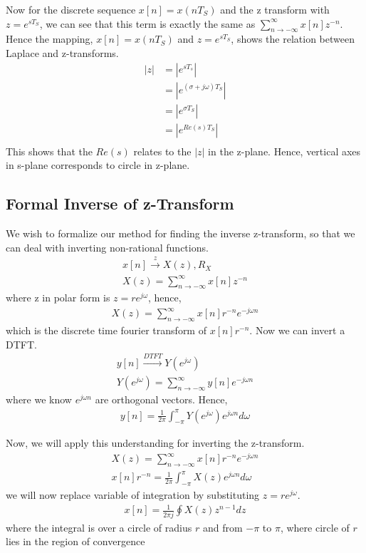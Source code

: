 Now for the discrete sequence $x[n] = x(nT_S)$ and the z transform with $z = e^{sT_S}$, we can see that this term is exactly the same as $\sum_{n \rightarrow -\infty}^{\infty}{x[n]z^{-n}}$.\\

Hence the mapping,  $x[n] = x(nT_S)$ and $z = e^{sT_S}$, shows the relation between Laplace and z-transforms.
\begin{align*}
|z| &= |e^{sT_s}| \\
&= |e^{(\sigma + j\omega)T_S}|\\
& = |e^{\sigma T_S}|\\
& = |e^{Re(s) T_S}|\\
\end{align*}
This shows that the $Re(s)$ relates to the $|z|$ in the z-plane. Hence, vertical axes in s-plane corresponds to circle in z-plane. 
\subsection{Formal Inverse of z-Transform}
We wish to formalize our method for finding the inverse z-transform, so that we can deal with inverting non-rational functions.
\begin{align*}
x[n] \xrightarrow{z} X(z), R_X\\
X(z) = \sum_{n \rightarrow -\infty}^{\infty}{x[n]z^{-n}}
\end{align*}
where z in polar form is $z = re^{j\omega}$, hence,
\begin{align*}
X(z) = \sum_{n \rightarrow -\infty}^{\infty}{x[n]r^{-n}e^{-j\omega n}}
\end{align*}
which is the discrete time fourier transform of $x[n]r^{-n}$. Now we can invert a DTFT. 
\begin{align*}
y[n] \xrightarrow{DTFT} Y(e^{j\omega})\\
Y(e^{j\omega}) = \sum_{n \rightarrow -\infty}^{\infty}{y[n]e^{-j\omega n}}
\end{align*}
where we know $e^{j\omega n}$ are orthogonal vectors. Hence,
\begin{align*}
y[n] =\frac{1}{2\pi} \int_{-\pi}^{\pi}{Y(e^{j\omega})e^{j\omega n}d\omega }
\end{align*}

Now, we will apply this understanding for inverting the z-transform.
\begin{align*}
X(z) = \sum_{n \rightarrow -\infty}^{\infty}{x[n]r^{-n}e^{-j\omega n}}\\
x[n]r^{-n} = \frac{1}{2\pi} \int_{-\pi}^{\pi}{X(z)e^{j\omega n}d\omega }
\end{align*}
we will now replace variable of integration by substituting $z = re^{j\omega}$.
\begin{align*}
x[n] = \frac{1}{2\pi j} \oint{X(z)z^{n-1}dz }
\end{align*}
where the integral is over a circle of radius $r$ and from $-\pi$ to $\pi$, where circle of $r$ lies in the region of convergence


